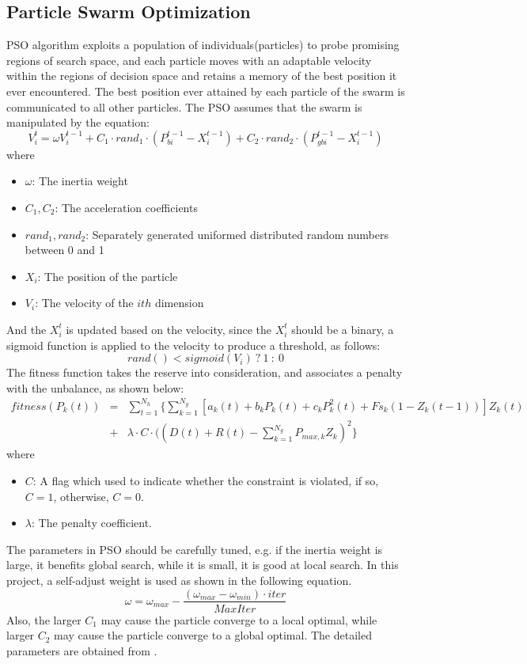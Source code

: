 \documentclass[a4paper, 12pt, notitlepage]{report}
\begin{document}
\subsection{Particle Swarm Optimization}
PSO algorithm exploits a population of individuals(particles) to probe promising regions of search space, and each particle moves with an adaptable velocity within the regions of decision space and retains a memory of the best position it ever encountered. The best position ever attained by each particle of the swarm is communicated to all other particles.
The PSO assumes that the swarm is manipulated by the equation:
\begin{equation}
V_{i}^{t} = \omega V_{i}^{t-1}+C_{1}\cdot rand_{1}\cdot(P_{bi}^{t-1}-X_{i}^{t-1})+ C_{2}\cdot rand_{2}\cdot(P_{gbi}^{t-1}-X_{i}^{t-1})
\end{equation}
where
\begin{itemize}
  \item $\omega$: The inertia weight
  \item $C_{1},C_{2}$: The acceleration coefficients
  \item $rand_{1},rand_{2}$: Separately generated uniformed distributed random numbers between 0 and 1
  \item $X_{i}$: The position of the particle
  \item $V_{i}$: The velocity of the $ith$ dimension
\end{itemize}
And the $X_{i}^{t}$ is updated based on the velocity, since the $X_{i}^{t}$ should be a binary, a sigmoid function is applied to the velocity to produce a threshold, as follows:
\begin{equation}
rand() < sigmoid(V_{i})~? ~1~:~0
\end{equation}
The fitness function takes the reserve into consideration, and associates a penalty with the unbalance, as shown below:
\begin{eqnarray}
fitness(P_{k}(t)) &=& \sum_{t=1}^{N_h} \{\sum_{k=1}^{N_g}[a_{k}(t)+b_{k}P_{k}(t)+c_{k}P_{k}^2(t)+Fs_{k}(1-Z_{k}(t-1))]Z_{k}(t)\nonumber\\
&+&\lambda \cdot C \cdot((D(t)+R(t)-\sum_{k=1}^{N_g}P_{max,k}Z_{k})^{2}\}
\end{eqnarray}
where
\begin{itemize}
  \item $C$: A flag which used to indicate whether the constraint is violated, if so, $C=1$, otherwise, $C=0$.
  \item $\lambda$: The penalty coefficient.
\end{itemize}
The parameters in PSO should be carefully tuned, e.g. if the inertia weight is large, it benefits global search, while it is small, it is good at local search. In this project, a self-adjust weight is used as shown in the following equation.
\begin{equation}
\omega = \omega_{max} - \frac{(\omega_{max}-\omega_{min})\cdot iter}{MaxIter}
\end{equation}
Also, the larger $C_1$ may cause the particle converge to a local optimal, while larger $C_2$ may cause the particle converge to a global optimal.
The detailed parameters are obtained from \cite{8}.
\end{document}
